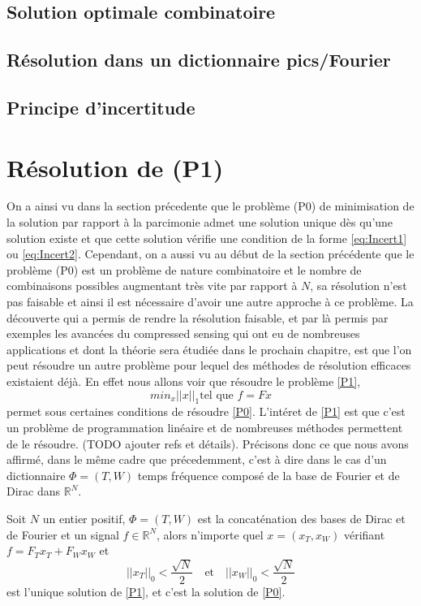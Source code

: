 \subsection{Solution optimale combinatoire}
\subsection{Résolution dans un dictionnaire pics/Fourier}
\subsection{Principe d'incertitude}

\section{Résolution de (P1)}
On a ainsi vu dans la section précedente que le problème (P0) de minimisation de la solution par rapport à la parcimonie admet une solution unique dès qu'une solution existe et que cette solution vérifie une condition de la forme \ref{eq:Incert1} ou \ref{eq:Incert2}.
Cependant, on a aussi vu au début de la section précédente que le problème (P0) est un problème de nature combinatoire et le nombre de combinaisons possibles augmentant très vite par rapport à $N$, sa résolution n'est pas faisable et ainsi il est nécessaire d'avoir une autre approche à ce problème.
\newline
La découverte qui a permis de rendre la résolution faisable, et par là permis par exemples les avancées du compressed sensing qui ont eu de nombreuses applications et dont la théorie sera étudiée dans le prochain chapitre, est que l'on peut résoudre un autre problème pour lequel des méthodes de résolution efficaces existaient déjà.
En effet nous allons voir que résoudre le problème \ref{P1},
\begin{equation}\label{P1}\tag{P1}
	min_x ||x||_1 \text{tel que } f = Fx 
\end{equation}
permet sous certaines conditions de résoudre \ref{P0}.
L'intéret de \ref{P1} est que c'est un problème de programmation linéaire et de nombreuses méthodes permettent de le résoudre. (TODO ajouter refs et détails).
Précisons donc ce que nous avons affirmé, dans le même cadre que précedemment, c'est à dire dans le cas d'un dictionnaire $\Phi = (T,W)$ temps fréquence composé de la base de Fourier et de Dirac dans $\mathbb{R}^N$.
\begin{theoreme}\label{th:DiracFourier}
	Soit $N$ un entier positif, $\Phi = (T, W)$ est la concaténation des bases de Dirac et de Fourier et un signal $f\in \mathbb{R}^N$, alors n'importe quel $x = (x_T, x_W)$ vérifiant $f = F_T x_T + F_W x_W$ et
	\begin{equation}\label{eq:cond1}
		||x_T||_0 < \frac{\sqrt{N}}{2} \quad \text{et} \quad   ||x_W||_0 < \frac{\sqrt{N}}{2}
	\end{equation}
	est l'unique solution de \ref{P1}, et c'est la solution de \ref{P0}.
\end{theoreme}
